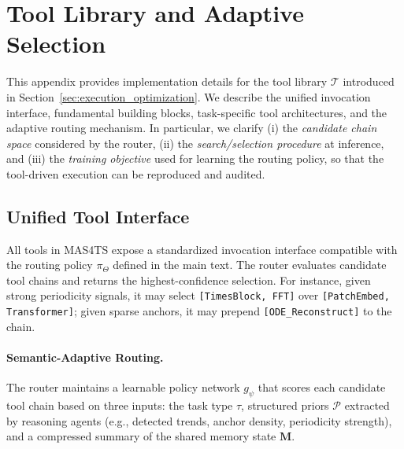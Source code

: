 \newpage
\section{Tool Library and Adaptive Selection}
\label{appx:tool_library}

This appendix provides implementation details for the tool library $\mathcal{T}$ introduced in Section~\ref{sec:execution_optimization}. We describe the unified invocation interface, fundamental building blocks, task-specific tool architectures, and the adaptive routing mechanism. In particular, we clarify (i) the \emph{candidate chain space} considered by the router, (ii) the \emph{search/selection procedure} at inference, and (iii) the \emph{training objective} used for learning the routing policy, so that the tool-driven execution can be reproduced and audited.

\subsection{Unified Tool Interface}
\label{appx:unified_interface}

All tools in MAS4TS expose a standardized invocation interface compatible with the routing policy $\pi_{\Theta}$ defined in the main text. 
The router evaluates candidate tool chains and returns the highest-confidence selection. For instance, given strong periodicity signals, it may select \texttt{[TimesBlock, FFT]} over \texttt{[PatchEmbed, Transformer]}; given sparse anchors, it may prepend \texttt{[ODE\_Reconstruct]} to the chain.


\paragraph{Semantic-Adaptive Routing.}
The router maintains a learnable policy network $g_{\psi}$ that scores each candidate tool chain based on three inputs: the task type $\tau$, structured priors $\mathcal{P}$ extracted by reasoning agents (e.g., detected trends, anchor density, periodicity strength), and a compressed summary of the shared memory state $\mathbf{M}$. %

